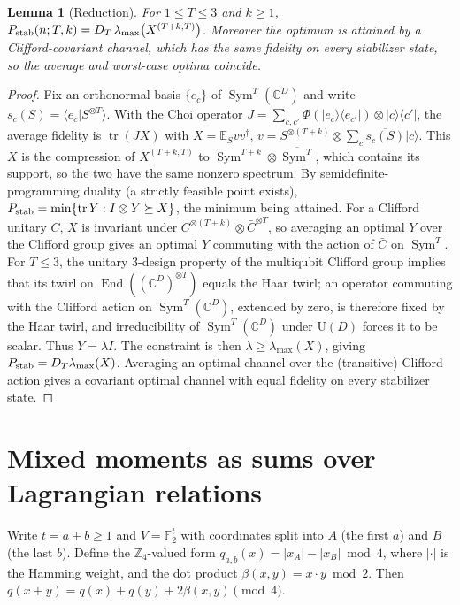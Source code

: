 \documentclass[11pt]{article}
\newcommand{\C}{\mathbb{C}}
\newcommand{\F}{\mathbb{F}}
\newcommand{\E}{\mathbb{E}}
\newcommand{\tr}{\operatorname{tr}}
\newcommand{\Sym}{\operatorname{Sym}}
\newcommand{\ket}[1]{\lvert #1\rangle}
\newcommand{\bra}[1]{\langle #1\rvert}
\newtheorem{lemma}[theorem]{Lemma}
\theoremstyle{definition}
\theoremstyle{remark}
\begin{document}
\begin{lemma}[Reduction]\label{lem:red}
For $1\le T\le3$ and $k\ge1$, $P_{\rm stab}(n;T,k)=D_T\,\lambda_{\max}\big(X^{(T+k,T)}\big)$. Moreover the optimum
is attained by a Clifford-covariant channel, which has the same fidelity on every stabilizer state, so the average
and worst-case optima coincide.
\end{lemma}
\begin{proof}
Fix an orthonormal basis $\{e_c\}$ of $\Sym^T(\C^D)$ and write $s_c(S)=\langle e_c|S^{\otimes T}\rangle$. With the
Choi operator $J=\sum_{c,c'}\Phi(\ket{e_c}\!\bra{e_{c'}})\otimes\ket c\!\bra{c'}$, the average fidelity is $\tr(JX)$
with $X=\E_S vv^\dagger$, $v=S^{\otimes(T+k)}\otimes\sum_c\overline{s_c(S)}\ket c$. This $X$ is the compression of
$X^{(T+k,T)}$ to $\Sym^{T+k}\otimes\overline{\Sym^T}$, which contains its support, so the two have the same nonzero
spectrum. By semidefinite-programming duality (a strictly feasible point exists),
$P_{\rm stab}=\min\{\tr Y: I\otimes Y\succeq X\}$, the minimum being attained. For a Clifford unitary $C$, $X$ is
invariant under $C^{\otimes(T+k)}\otimes\bar C^{\otimes T}$, so averaging an optimal $Y$ over the Clifford group
gives an optimal $Y$ commuting with the action of $\bar C$ on $\Sym^T$. For $T\le3$, the unitary 3-design property of the multiqubit Clifford group
\cite{Zhu2017,Webb2016} implies that its twirl on $\operatorname{End}((\C^D)^{\otimes T})$ equals the Haar twirl; an
operator commuting with the Clifford action on $\Sym^T(\C^D)$, extended by zero, is therefore fixed by the Haar twirl,
and irreducibility of $\Sym^T(\C^D)$ under $\mathrm{U}(D)$ forces it to be scalar. Thus $Y=\lambda I$. The constraint is then
$\lambda\ge\lambda_{\max}(X)$, giving $P_{\rm stab}=D_T\lambda_{\max}(X)$. Averaging an optimal channel over the
(transitive) Clifford action gives a covariant optimal channel with equal fidelity on every stabilizer state.
\end{proof}

\section{Mixed moments as sums over Lagrangian relations}\label{sec:moments}
Write $t=a+b\ge1$ and $V=\F_2^t$ with coordinates split into $A$ (the first $a$) and $B$ (the last $b$). Define the
$\mathbb Z_4$-valued form $q_{a,b}(x)=|x_A|-|x_B| \bmod 4$, where $|\cdot|$ is the Hamming weight, and the dot product
$\beta(x,y)=x\cdot y\bmod2$. Then $q(x+y)=q(x)+q(y)+2\beta(x,y)\pmod4$.
\end{document}
